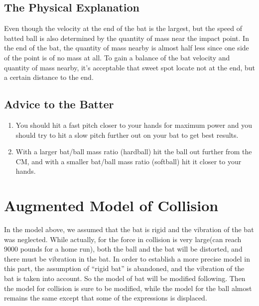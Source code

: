 \documentclass[12pt]{article}
\begin{document}
\subsection{The Physical Explanation}

Even though the velocity at the end of the bat is the largest, but
the speed of batted ball is also determined by the quantity
of mass near the impact point. In the end of the bat, the quantity
of mass nearby is almost half less since one side of the point is of no mass at
all. To gain a balance of the bat velocity and quantity of mass
nearby, it's acceptable that sweet spot locate not at the end, but a certain distance to the end.


\subsection{Advice to the Batter}
\begin{enumerate}
\item You should hit a fast pitch closer to your hands for maximum power and you should try to hit a slow pitch
further out on your bat to get best results.
\item With a larger bat/ball mass ratio (hardball) hit the ball out further from the CM, and with a smaller bat/ball
mass ratio (softball) hit it closer to your hands.
\end{enumerate}

\section{Augmented Model of Collision}

In the model above, we assumed that the bat is rigid and the vibration of the bat was neglected.
While actually, for the force in collision is very large(can reach 9000 pounds for a home run\cite{K.Adair2002}),
both the ball and the bat will be
distorted, and there must be vibration in the bat. In order to establish a more precise model in this part, the assumption of ``rigid bat'' is abandoned, and the vibration of the bat is taken into account. So the model of bat will be modified following. Then the model for collision is sure to be modified, while the model for the ball almost remains the same except that some of the expressions is displaced.
\end{document}
